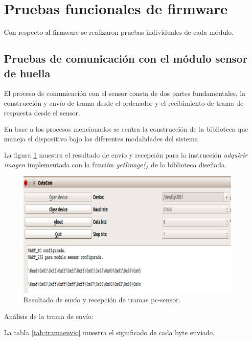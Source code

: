 \section{Pruebas funcionales de firmware}
Con respecto al firmware se realizaron pruebas individuales de cada módulo.

\subsection{Pruebas de comunicación con el módulo sensor de huella}
El proceso de comunicación con el sensor consta de dos partes fundamentales, la construcción y envío de trama desde el ordenador y el recibimiento de trama de respuesta desde el sensor.

En base a los procesos mencionados se centra la construcción de la biblioteca que maneja el dispositivo bajo las diferentes modalidades del sistema. 

La figura \ref{fig:comsen} muestra el resultado de envío y recepción para la instrucción \textit{adquirir imagen} implementada con la función \textit{getImage()} de la biblioteca diseñada.

\begin{figure}[H]
	\centering
	\includegraphics[scale =.3]{./Figures/comsen.png}
	\caption{Resultado de envío y recepción de tramas pc-sensor.}
	\label{fig:comsen}
\end{figure}

Análisis de la trama de envío:

La tabla \ref{tab:tramaenvio} muestra el significado de cada byte enviado.

